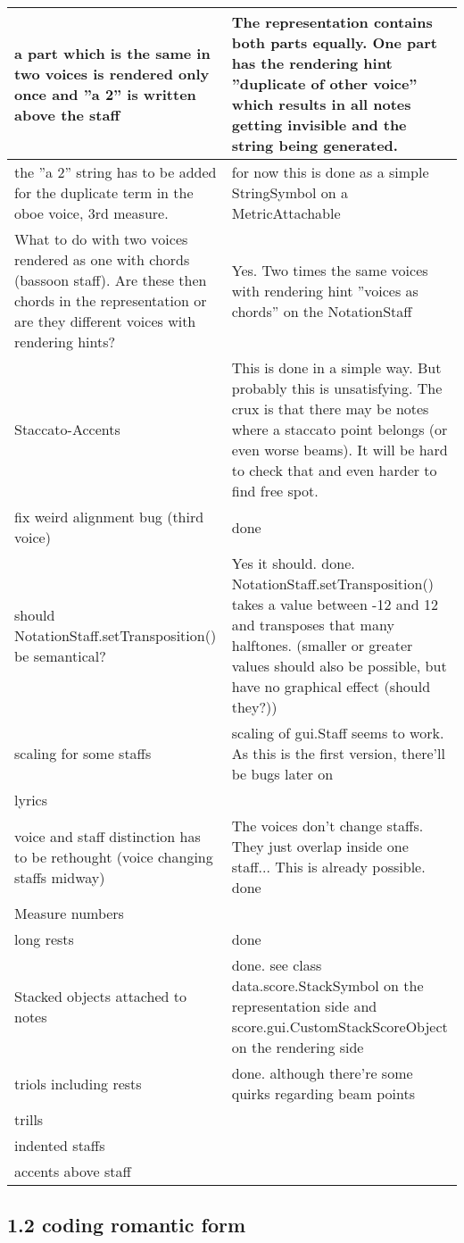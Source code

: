 \begin{tabular}{|p{}|p{}|}
\\ 	\hline
 a part which is the same in two voices is rendered only once and ''a 2'' is written above the staff &
  The representation contains both parts equally. One part has the rendering hint ''duplicate of other voice'' which results in all notes getting invisible and the string being generated. 
\\ 	\hline
 the ''a 2'' string has to be added for the duplicate term in the oboe voice, 3rd measure. &
  for now this is done as a simple StringSymbol on a MetricAttachable 
\\ 	\hline
 What to do with two voices rendered as one with chords (bassoon staff). Are these then chords in the representation or are they different voices with rendering hints? &
  Yes. Two times the same voices with rendering hint ''voices as chords'' on the NotationStaff 
\\ 	\hline
 Staccato-Accents &
  This is done in a simple way. But probably this is unsatisfying. The crux is that there may be notes where a staccato point belongs (or even worse beams). It will be hard to check that and even harder to find free spot. 
\\ 	\hline
 fix weird alignment bug (third voice) &
  done 
\\ 	\hline
 should NotationStaff.setTransposition() be semantical? &
  Yes it should. done. NotationStaff.setTransposition() takes a value between -12 and 12 and transposes that many halftones. (smaller or greater values should also be possible, but have no graphical effect (should they?)) 
\\ 	\hline
 scaling for some staffs &
  scaling of gui.Staff seems to work. As this is the first version, there'll be bugs later on 
\\ 	\hline
 lyrics &
  
\\ 	\hline
 voice and staff distinction has to be rethought (voice changing staffs midway) &
  The voices don't change staffs. They just overlap inside one staff... This is already possible. done 
\\ 	\hline
 Measure numbers &
  
\\ 	\hline
 long rests &
  done 
\\ 	\hline
 Stacked objects attached to notes &
  done. see class data.score.StackSymbol on the representation side and score.gui.CustomStackScoreObject on the rendering side 
\\ 	\hline
 triols including rests &
  done. although there're some quirks regarding beam points 
\\ 	\hline
 trills &
  
\\ 	\hline
 indented staffs &
  
\\ 	\hline
 accents above staff &
  
\\ 	\hline
 \end{tabular} \subsection*{1.2 coding romantic form}
